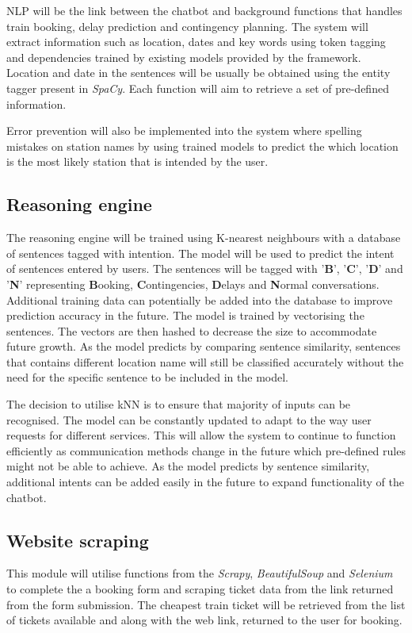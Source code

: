 \documentclass[11pt]{article}
\begin{document}
NLP will be the link between the chatbot and background functions that handles train booking, delay prediction and contingency planning. The system will extract information such as location, dates and key words using token tagging and dependencies trained by existing models provided by the framework. Location and date in the sentences will be usually be obtained using the entity tagger present in \textit{SpaCy}. Each function will aim to retrieve a set of pre-defined information.

Error prevention will also be implemented into the system where spelling mistakes on station names by using trained models to predict the which location is the most likely station that is intended by the user.

\subsection{Reasoning engine}
The reasoning engine will be trained using K-nearest neighbours with a database of sentences tagged with intention. The model will be used to predict the intent of sentences entered by users. The sentences will be tagged with '\textbf{B}', '\textbf{C}', '\textbf{D}' and '\textbf{N}' representing \textbf{B}ooking, \textbf{C}ontingencies, \textbf{D}elays and \textbf{N}ormal conversations. Additional training data can potentially be added into the database to improve prediction accuracy in the future. The model is trained by vectorising the sentences. The vectors are then hashed to decrease the size to accommodate future growth. As the model predicts by comparing sentence similarity, sentences that contains different location name will still be classified accurately without the need for the specific sentence to be included in the model.

The decision to utilise kNN is to ensure that majority of inputs can be recognised. The model can be constantly updated to adapt to the way user requests for different services. This will allow the system to continue to function efficiently as communication methods change in the future which pre-defined rules might not be able to achieve. As the model predicts by sentence similarity, additional intents can be added easily in the future to expand functionality of the chatbot.

\subsection{Website scraping}
This module will utilise functions from the \textit{Scrapy}, \textit{BeautifulSoup} and \textit{Selenium} to complete the a booking form and scraping ticket data from the link returned from the form submission. The cheapest train ticket will be retrieved from the list of tickets available and along with the web link, returned to the user for booking.
\end{document}
